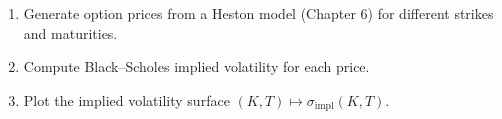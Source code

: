 \begin{exercise}
\begin{enumerate}
    \item Generate option prices from a Heston model (Chapter 6) for
          different strikes and maturities.
    \item Compute Black--Scholes implied volatility for each price.
    \item Plot the implied volatility surface $(K, T) \mapsto
          \sigma_{\text{impl}}(K,T)$.
\end{enumerate}
\end{exercise}
